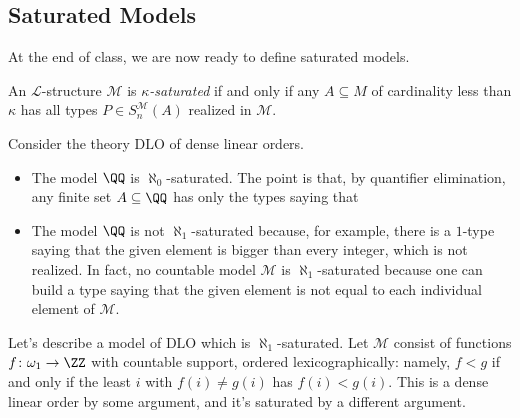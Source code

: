 \documentclass[../notes.tex]{subfiles}
\begin{document}
\subsection{Saturated Models}
At the end of class, we are now ready to define saturated models.
\begin{defihelper} 
	An $\mathcal L$-structure $\mathcal M$ is \textit{$\kappa$-saturated} if and only if any $A\subseteq M$ of cardinality less than $\kappa$ has all types $P\in S_n^\mathcal M(A)$ realized in $\mathcal M$.
\end{defihelper}
\begin{example}
	Consider the theory $\mathrm{DLO}$ of dense linear orders.
	\begin{itemize}
		\item The model $\QQ$ is $\aleph_0$-saturated. The point is that, by quantifier elimination, any finite set $A\subseteq\QQ$ has only the types saying that
		\item The model $\QQ$ is not $\aleph_1$-saturated because, for example, there is a $1$-type saying that the given element is bigger than every integer, which is not realized. In fact, no countable model $\mathcal M$ is $\aleph_1$-saturated because one can build a type saying that the given element is not equal to each individual element of $\mathcal M$.
	\end{itemize}
\end{example}
\begin{example}
	Let's describe a model of $\mathrm{DLO}$ which is $\aleph_1$-saturated. Let $\mathcal M$ consist of functions $f\colon\omega_1\to\ZZ$ with countable support, ordered lexicographically: namely, $f<g$ if and only if the least $i$ with $f(i)\ne g(i)$ has $f(i)<g(i)$. This is a dense linear order by some argument, and it's saturated by a different argument.
\end{example}
\end{document}

